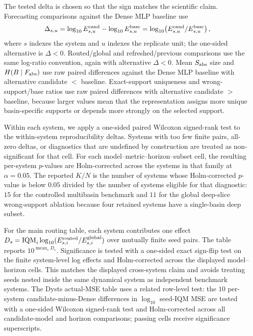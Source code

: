 The tested delta is chosen so that the sign matches the scientific claim. Forecasting comparisons against the Dense MLP baseline use
\begin{equation}
  \Delta_{s,u}
  =
  \log_{10} E^{\rm cand}_{s,u}
  -
  \log_{10} E^{\rm base}_{s,u}
  =
  \log_{10}\!\left(E^{\rm cand}_{s,u}/E^{\rm base}_{s,u}\right),
\end{equation}
where $s$ indexes the system and $u$ indexes the replicate unit; the one-sided alternative is $\Delta<0$. Routed/global and refreshed/previous comparisons use the same log-ratio convention, again with alternative $\Delta<0$. Mean \(S_{\rm abs}\) size and \(H(B\mid F_{\rm abs})\) use raw paired differences against the Dense MLP baseline with alternative candidate $<$ baseline. Exact-support uniqueness and wrong-support/base ratios use raw paired differences with alternative candidate $>$ baseline, because larger values mean that the representation assigns more unique basin-specific supports or depends more strongly on the selected support.

Within each system, we apply a one-sided paired Wilcoxon signed-rank test to the within-system reproducibility deltas. Systems with too few finite pairs, all-zero deltas, or diagnostics that are undefined by construction are treated as non-significant for that cell. For each model--metric--horizon--subset cell, the resulting per-system \(p\)-values are Holm-corrected across the systems in that family at \(\alpha=0.05\). The reported \(K/N\) is the number of systems whose Holm-corrected \(p\)-value is below \(0.05\) divided by the number of systems eligible for that diagnostic: \(15\) for the controlled multibasin benchmark and \(11\) for the global deep-slice wrong-support ablation because four retained systems have a single-basin deep subset.

For the main routing table, each system contributes one effect \(D_s=\operatorname{IQM}_i\log_{10}(E^{\rm routed}_{s,i}/E^{\rm global}_{s,i})\) over mutually finite seed pairs. The table reports \(10^{\operatorname{mean}_s D_s}\). Significance is tested with a one-sided exact sign-flip test on the finite system-level log effects and Holm-corrected across the displayed model--horizon cells. This matches the displayed cross-system claim and avoids treating seeds nested inside the same dynamical system as independent benchmark systems. The Dysts actual-MSE table uses a related row-level test: the \(10\) per-system candidate-minus-Dense differences in \(\log_{10}\) seed-IQM MSE are tested with a one-sided Wilcoxon signed-rank test and Holm-corrected across all candidate-model and horizon comparisons; passing cells receive significance superscripts.

